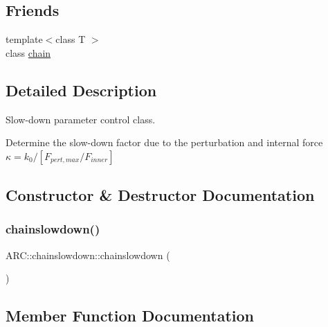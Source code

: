 \subsection*{Friends}
\begin{DoxyCompactItemize}
\item 
{\footnotesize template$<$class T $>$ }\\class \hyperlink{classARC_1_1chainslowdown_a498fbb4337b9878a5f0044996e4a2489}{chain}
\end{DoxyCompactItemize}


\subsection{Detailed Description}
Slow-\/down parameter control class. 

Determine the slow-\/down factor due to the perturbation and internal force $ \kappa = k_0 / [F_{pert,max}/F_{inner}] $ 

\subsection{Constructor \& Destructor Documentation}
\hypertarget{classARC_1_1chainslowdown_a3e91bbce388e9f0b01e2af5504dc694c}{}\label{classARC_1_1chainslowdown_a3e91bbce388e9f0b01e2af5504dc694c} 
\subsubsection{\texorpdfstring{chainslowdown()}{chainslowdown()}}
{\footnotesize\ttfamily A\+R\+C\+::chainslowdown\+::chainslowdown (\begin{DoxyParamCaption}{ }\end{DoxyParamCaption})\hspace{0.3cm}{\ttfamily [inline]}}



\subsection{Member Function Documentation}
\hypertarget{classARC_1_1chainslowdown_a5093b87af419b0a39dd73bfff7fd4915}{}\label{classARC_1_1chainslowdown_a5093b87af419b0a39dd73bfff7fd4915} 
